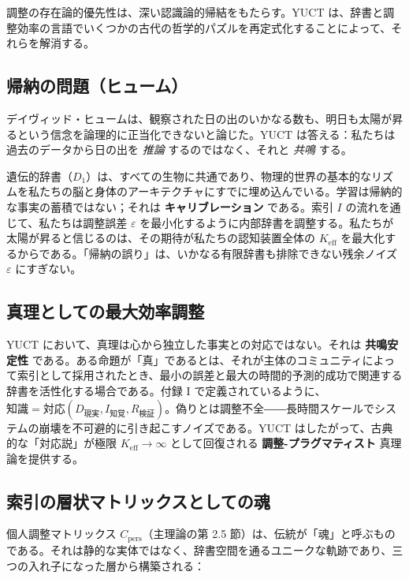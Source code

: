 \documentclass[12pt,a4paper]{article}
\newcommand{\Keff}{K_{\mathrm{eff}}}
\begin{document}
	調整の存在論的優先性は、深い認識論的帰結をもたらす。YUCT は、辞書と調整効率の言語でいくつかの古代の哲学的パズルを再定式化することによって、それらを解消する。
	
	\subsection{帰納の問題（ヒューム）}
	
	デイヴィッド・ヒュームは、観察された日の出のいかなる数も、明日も太陽が昇るという信念を論理的に正当化できないと論じた。YUCT は答える：私たちは過去のデータから日の出を \emph{推論} するのではなく、それと \emph{共鳴} する。
	
	遺伝的辞書（\(D_1\)）は、すべての生物に共通であり、物理的世界の基本的なリズムを私たちの脳と身体のアーキテクチャにすでに埋め込んでいる。学習は帰納的な事実の蓄積ではない；それは \textbf{キャリブレーション} である。索引 \(I\) の流れを通じて、私たちは調整誤差 \(\varepsilon\) を最小化するように内部辞書を調整する。私たちが太陽が昇ると信じるのは、その期待が私たちの認知装置全体の \(K_{\mathrm{eff}}\) を最大化するからである。「帰納の誤り」は、いかなる有限辞書も排除できない残余ノイズ \(\varepsilon\) にすぎない。
	
	\subsection{真理としての最大効率調整}
	
	YUCT において、真理は心から独立した事実との対応ではない。それは \textbf{共鳴安定性} である。ある命題が「真」であるとは、それが主体のコミュニティによって索引として採用されたとき、最小の誤差と最大の時間的予測的成功で関連する辞書を活性化する場合である。付録 I で定義されているように、\(\text{知識} = \text{対応}(D_{\text{現実}}, I_{\text{知覚}}, R_{\text{検証}})\)。偽りとは調整不全――長時間スケールでシステムの崩壊を不可避的に引き起こすノイズである。YUCT はしたがって、古典的な「対応説」が極限 \(\Keff \to \infty\) として回復される \textbf{調整-プラグマティスト} 真理論を提供する。
	
	\subsection{索引の層状マトリックスとしての魂}
	
	個人調整マトリックス \(C_{\mathrm{pers}}\)（主理論の第 2.5 節）は、伝統が「魂」と呼ぶものである。それは静的な実体ではなく、辞書空間を通るユニークな軌跡であり、三つの入れ子になった層から構築される：
	
\end{document}
